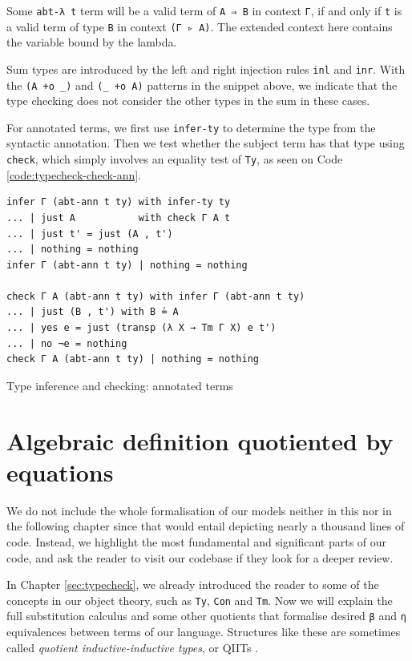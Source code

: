 Some \verb$abt-λ t$ term will be a valid term of \verb$A ⇒ B$ in context \verb$Γ$, if and only if \verb$t$ is a valid term of type \verb$B$ in context \verb$(Γ ▹ A)$. The extended context here contains the variable bound by the lambda.

Sum types are introduced by the left and right injection rules \verb$inl$ and \verb$inr$. With the \verb$(A +o _)$ and \verb$(_ +o A)$ patterns in the snippet above, we indicate that the type checking does not consider the other types in the sum in these cases.

For annotated terms, we first use \verb$infer-ty$ to determine the type from the syntactic annotation. Then we test whether the subject term has that type using \verb$check$, which simply involves an equality test of \verb$Ty$, as seen on Code \ref{code:typecheck-check-ann}.

\begin{listing}[H]
\begin{verbatim}
infer Γ (abt-ann t ty) with infer-ty ty
... | just A           with check Γ A t
... | just t' = just (A , t')
... | nothing = nothing
infer Γ (abt-ann t ty) | nothing = nothing

check Γ A (abt-ann t ty) with infer Γ (abt-ann t ty)
... | just (B , t') with B ≟ A
... | yes e = just (transp (λ X → Tm Γ X) e t')
... | no ¬e = nothing
check Γ A (abt-ann t ty) | nothing = nothing
\end{verbatim}
\caption{Type inference and checking: annotated terms}
\label{code:typecheck-check-ann}
\end{listing}

\section{Algebraic definition quotiented by equations} \label{sec:algebraic-def}

We do not include the whole formalisation of our models neither in this nor in the following chapter since that would entail depicting nearly a thousand lines of code. Instead, we highlight the most fundamental and significant parts of our code, and ask the reader to visit our codebase if they look for a deeper review.

In Chapter \ref{sec:typecheck}, we already introduced the reader to some of the concepts in our object theory, such as \verb$Ty$, \verb$Con$ and \verb$Tm$. Now we will explain the full substitution calculus and some other quotients that formalise desired \verb$β$ and \verb$η$ equivalences between terms of our language. Structures like these are sometimes called \textit{quotient inductive-inductive types}, or QIITs \cite{altenkirch2018quotient}.


